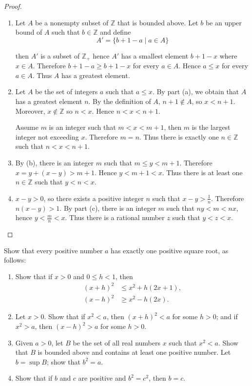 \begin{proof}
    \begin{enumerate}[label={(\alph*)}]
        \item Let $A$ be a nonempty subset of $\mathbb{Z}$ that is bounded above. Let $b$ be an upper bound of $A$ such that $b\in\mathbb{Z}$ and define
              \[
                  A' = \{ b + 1 - a \mid a\in A \}
              \]

              then $A'$ is a subset of $\mathbb{Z}_{+}$ hence $A'$ has a smallest element $b + 1 - x$ where $x\in A$. Therefore $b + 1 - a\geq b + 1 - x$ for every $a\in A$. Hence $a\leq x$ for every $a\in A$. Thus $A$ has a greatest element.
        \item Let $A$ be the set of integers $a$ such that $a\leq x$. By part (a), we obtain that $A$ has a greatest element $n$. By the definition of $A$, $n + 1\notin A$, so $x < n + 1$. Moreover, $x\notin\mathbb{Z}$ so $n < x$. Hence $n < x < n + 1$.

              Assume $m$ is an integer such that $m < x < m + 1$, then $m$ is the largest integer not exceeding $x$. Therefore $m = n$. Thus there is exactly one $n\in\mathbb{Z}$ such that $n < x < n + 1$.
        \item By (b), there is an integer $m$ such that $m\leq y < m + 1$. Therefore $x = y + (x - y) > m + 1$. Hence $y < m + 1 < x$. Thus there is at least one $n\in\mathbb{Z}$ such that $y < n < x$.
        \item $x - y > 0$, so there exists a positive integer $n$ such that $x - y > \frac{1}{n}$. Therefore $n(x - y) > 1$. By part (c), there is an integer $m$ such that $ny < m < nx$, hence $y < \frac{m}{n} < x$. Thus there is a rational number $z$ such that $y < z < x$.
    \end{enumerate}
\end{proof}

\begin{exercise}\label{chapter1:section4:exercise10}
    Show that every positive number $a$ has exactly one positive square root, as follows:
    \begin{enumerate}[label={(\alph*)}]
        \item Show that if $x > 0$ and $0\leq h < 1$, then
              \begin{align*}
                  {(x + h)}^{2} & \leq x^{2} + h(2x + 1), \\
                  {(x - h)}^{2} & \geq x^{2} - h(2x).
              \end{align*}
        \item Let $x > 0$. Show that if $x^{2} < a$, then ${(x + h)}^{2} < a$ for some $h > 0$; and if $x^{2} > a$, then ${(x - h)}^{2} > a$ for some $h > 0$.
        \item Given $a > 0$, let $B$ be the set of all real numbers $x$ such that $x^{2} < a$. Show that $B$ is bounded above and contains at least one positive number. Let $b = \sup B$; show that $b^{2} = a$.
        \item Show that if $b$ and $c$ are positive and $b^{2} = c^{2}$, then $b = c$.
    \end{enumerate}
\end{exercise}

